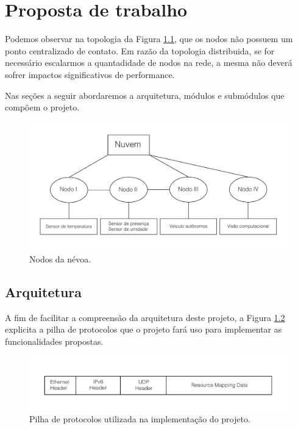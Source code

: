\chapter{\label{chap:chap3} Proposta de trabalho}


Podemos observar na topologia da Figura \ref{fig:fig1}, que os nodos não possuem um ponto centralizado de contato.
Em razão da topologia distribuida, se for necessário escalarmos a quantadidade de nodos na rede, a mesma não deverá sofrer impactos significativos de performance.


Nas seções a seguir abordaremos a arquitetura, módulos e submódulos que compõem o projeto.


\begin{figure}[htb!]
    \centering\includegraphics[width=.75\textwidth]{fig1.pdf}
    \caption%
    {\label{fig:fig1} Nodos da névoa.}
\end{figure}

\section{Arquitetura}

A fim de facilitar a compreensão da arquitetura deste projeto, a Figura \ref{fig:fig2} explicita a pilha de protocolos que o projeto fará uso para implementar as funcionalidades propostas.

\begin{figure}[htb!]
    \centering\includegraphics[width=.75\textwidth]{fig2.pdf}
    \caption%
    {\label{fig:fig2} Pilha de protocolos utilizada na implementação do projeto.}
\end{figure}

